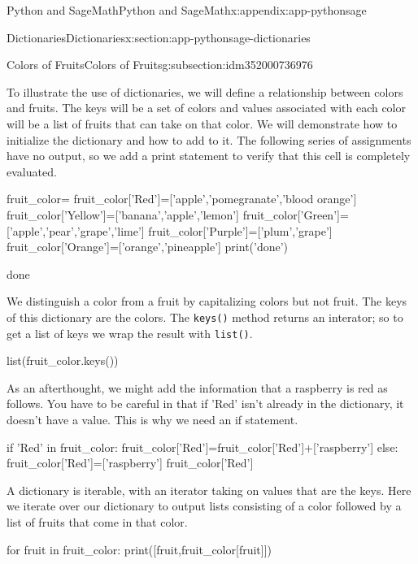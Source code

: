 \documentclass[oneside,10pt,]{book}
\newcommand{\mono}[1]{\texttt{#1}}
\begin{document}
\begin{appendixptx}{Python and SageMath}{}{Python and SageMath}{}{}{x:appendix:app-pythonsage}
\begin{sectionptx}{Dictionaries}{}{Dictionaries}{}{}{x:section:app-pythonsage-dictionaries}
\begin{subsectionptx}{Colors of Fruits}{}{Colors of Fruits}{}{}{g:subsection:idm352000736976}
\par
To illustrate the use of dictionaries, we will define a relationship between colors and fruits.  The keys will be a set of colors and values associated with each color will be a list of fruits that can take on that color. We will demonstrate how to initialize the dictionary and how to add to it.  The following series of assignments have no output, so we add a print statement to verify that this cell is completely evaluated.%
\begin{sageinput}
fruit_color={}
fruit_color['Red']=['apple','pomegranate','blood orange']
fruit_color['Yellow']=['banana','apple','lemon']
fruit_color['Green']=['apple','pear','grape','lime']
fruit_color['Purple']=['plum','grape']
fruit_color['Orange']=['orange','pineapple']
print('done')
\end{sageinput}
\begin{sageoutput}
done
\end{sageoutput}
We distinguish a color from a fruit by capitalizing colors but not fruit.  The keys of this dictionary are the colors.  The \mono{keys()} method returns an interator; so to get a list of keys we wrap the result with \mono{list()}.%
\begin{sageinput}
list(fruit_color.keys())
\end{sageinput}
\begin{sageoutput}
\end{sageoutput}
As an afterthought, we might add the information that a raspberry is red as follows. You have to be careful in that if 'Red' isn't already in the dictionary, it doesn't have a value. This is why we need an if statement.%
\begin{sageinput}
if 'Red' in fruit_color:
    fruit_color['Red']=fruit_color['Red']+['raspberry']
else:
    fruit_color['Red']=['raspberry']
fruit_color['Red']
\end{sageinput}
\begin{sageoutput}
\end{sageoutput}
A dictionary is iterable, with an iterator taking on values that are the keys.  Here we iterate over our dictionary to output lists consisting of a color followed by a list of fruits that come in that color.%
\begin{sageinput}
for fruit in fruit_color:
    print([fruit,fruit_color[fruit]])
\end{sageinput}
\begin{sageoutput}

\end{sageoutput}
\end{subsectionptx}
\end{sectionptx}
\end{appendixptx}
\end{document}
